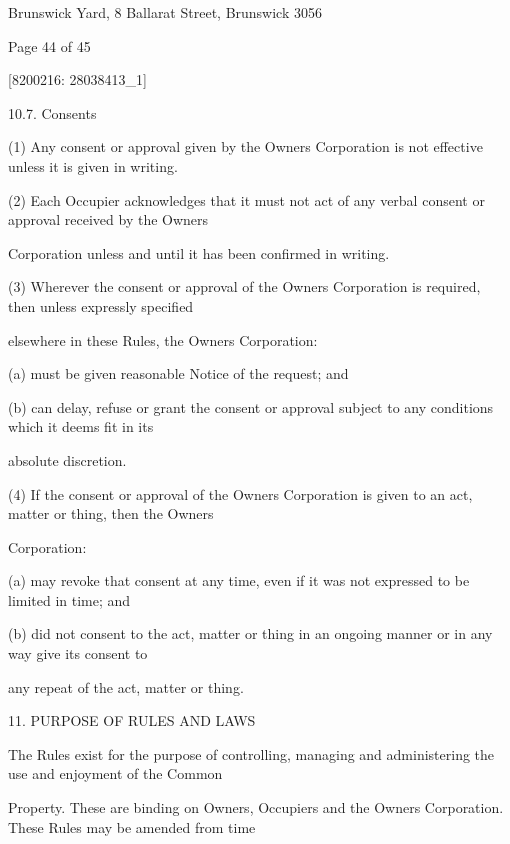 \documentclass{article}
\begin{document}
{\fontsize{9}{1}Brunswick Yard, 8 Ballarat Street, Brunswick 3056 }


{\fontsize{9}{1}Page 44  of 45 }



{\fontsize{7.02}{1}[8200216: 28038413\_1] }

{\fontsize{9.99}{1}10.7. Consents }

{\fontsize{9.962}{1}(1) Any consent or approval given by the Owners Corporation is not effective unless it is given in writing. }


{\fontsize{9.962}{1}(2) Each Occupier acknowledges that it must not act of any verbal consent or approval received by the Owners }

{\fontsize{10.02}{1}Corporation unless and until it has been confirmed in writing. }

{\fontsize{9.962}{1}(3) Wherever the consent or approval of the Owners Corporation is required, then unless expressly specified }

{\fontsize{10.02}{1}elsewhere in these Rules, the Owners Corporation: }

{\fontsize{9.962}{1}(a) must be given reasonable Notice of the request; and }

{\fontsize{9.962}{1}(b) can delay, refuse or grant the consent or approval subject to any conditions which it deems fit in its }

{\fontsize{10.02}{1}absolute discretion. }

{\fontsize{9.962}{1}(4) If the consent or approval of the Owners Corporation is given to an act, matter or thing, then the Owners }

{\fontsize{10.02}{1}Corporation: }

{\fontsize{9.962}{1}(a) may revoke that consent at any time, even if it was not expressed to be limited in time; and }

{\fontsize{9.962}{1}(b) did not consent to the act, matter or thing in an ongoing manner or in any way give its consent to }

{\fontsize{10.02}{1}any repeat of the act, matter or thing. }


{\fontsize{9.99}{1}11. PURPOSE OF RULES AND LAWS }

{\fontsize{10.02}{1}The Rules exist for the purpose of controlling, managing and administering the use and enjoyment of the Common }

{\fontsize{10.02}{1}Property. These are binding on Owners, Occupiers and the Owners Corporation. These Rules may be amended from time }
\end{document}
